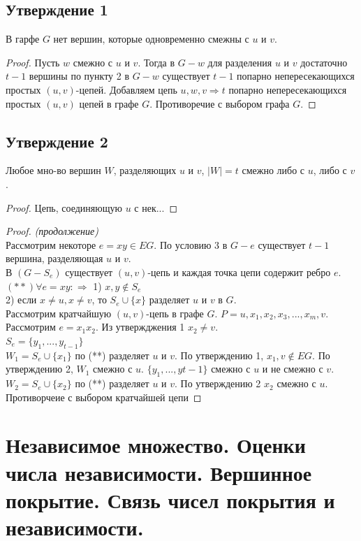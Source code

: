 \documentclass[12pt]{article}
\begin{document}
\subsection{Утверждение 1}
	В гарфе $G$ нет вершин, которые одновременно смежны с $u$ и $v$.
	\begin{proof}
		Пусть $w$ смежно с $u$ и $v$. Тогда в $G-w$ для разделения $u$ и $v$ достаточно $t-1$ вершины по пункту 2 в $G-w$ существует $t-1$ попарно непересекающихся
		простых $(u,v)$-цепей. Добавляем цепь $u,w,v \Rightarrow t$ попарно непересекающихся простых $(u,v)$ цепей в графе $G$. Противоречие с выбором графа $G$.
	\end{proof}
	
\subsection{Утверждение 2}
	Любое мно-во вершин $W$, разделяющих $u$ и $v$, $|W|=t$ смежно либо с $u$, либо с $v$.
	\begin{proof}
		Цепь, соединяющую $u$ с нек...
		
	\end{proof}

\begin{proof}\textit{(продолжение)}\\
	Рассмотрим некоторе $e=xy \in EG$. По условию 3 в $G-e$ существует $t-1$ вершина, разделяющая $u$ и $v$.\\
	В $(G-S_e)$ существует $(u,v)$-цепь и каждая точка цепи содержит ребро $e$.\\
	$(**)\forall e = xy: \Rightarrow $ 1) $x,y \not\in S_e$\\
	2) если $x\ne u, x \ne v$, то $S_e \cup \{x\}$ разделяет $u$ и $v$ в $G$.\\
	Рассмотрим кратчайшую $(u,v)$-цепь в графе $G$. $P=u, x_1, x_2, x_3, ..., x_m, v$.\\
	Рассмотрим $e=x_1x_2$. Из утвержджения 1 $x_2 \ne v$.\\
	$S_e = \{ y_1, ..., y_{t-1} \}$\\
	$W_1 = S_e \cup \{x_1\}$ по (**) разделяет $u$ и $v$. По утверждению 1, $x_1,v \not\in EG$. По утверждению 2, $W_1$ смежно с $u$. $\{y_1, ..., y{t-1} \}$ смежно с $u$ и не смежно с $v$.\\
	$W_2 = S_e \cup \{x_2\}$ по (**) разделяет $u$ и $v$. По утверждению 2 $x_2$ смежно с $u$. Противорчеие с выбором кратчайшей цепи
\end{proof}	

\section{Независимое множество. Оценки числа независимости. Вершинное покрытие. Связь чисел покрытия и независимости.}
\end{document}
